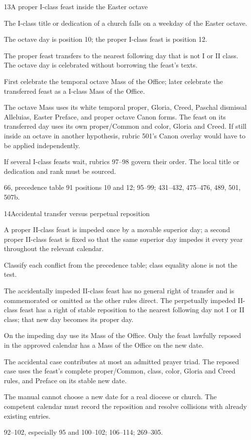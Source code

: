 \begin{casefile}{13}{A proper I-class feast inside the Easter octave}
\item[Calendar facts] The I-class title or dedication of a church falls on a weekday of the Easter octave.
\item[Ranks and rows] The octave day is position 10; the proper I-class feast is position 12.
\item[Impeded item] The proper feast transfers to the nearest following day that is not I or II class.  The octave day is celebrated without borrowing the feast's texts.
\item[Mass category] First celebrate the temporal octave Mass of the Office; later celebrate the transferred feast as a I-class Mass of the Office.
\item[Assembly] The octave Mass uses its white temporal proper, Gloria, Creed, Paschal dismissal Alleluias, Easter Preface, and proper octave Canon forms.  The feast on its transferred day uses its own proper/Common and color, Gloria and Creed.  If still inside an octave in another hypothesis, rubric 501's Canon overlay would have to be applied independently.
\item[Boundary] If several I-class feasts wait, rubrics 97--98 govern their order.  The local title or dedication and rank must be sourced.
\item[Rubric locus] 66, precedence table 91 positions 10 and 12; 95--99; 431--432, 475--476, 489, 501, 507b.
\end{casefile}

\begin{casefile}{14}{Accidental transfer versus perpetual reposition}
\item[Calendar facts] A proper II-class feast is impeded once by a movable superior day; a second proper II-class feast is fixed so that the same superior day impedes it every year throughout the relevant calendar.
\item[Ranks and rows] Classify each conflict from the precedence table; class equality alone is not the test.
\item[Impeded item] The accidentally impeded II-class feast has no general right of transfer and is commemorated or omitted as the other rules direct.  The perpetually impeded II-class feast has a right of stable reposition to the nearest following day not I or II class; that new day becomes its proper day.
\item[Mass category] On the impeding day use its Mass of the Office.  Only the feast lawfully reposed in the approved calendar has a Mass of the Office on the new date.
\item[Assembly] The accidental case contributes at most an admitted prayer triad.  The reposed case uses the feast's complete proper/Common, class, color, Gloria and Creed rules, and Preface on its stable new date.
\item[Boundary] The manual cannot choose a new date for a real diocese or church.  The competent calendar must record the reposition and resolve collisions with already existing entries.
\item[Rubric locus] 92--102, especially 95 and 100--102; 106--114; 269--305.
\end{casefile}


